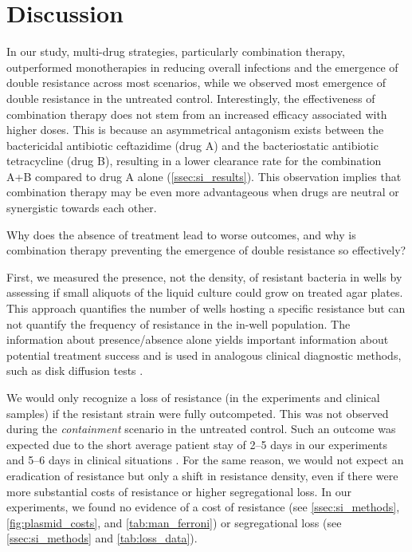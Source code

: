 \section{Discussion}
In our study, multi-drug strategies, particularly combination therapy, outperformed monotherapies in reducing overall infections and the emergence of double resistance across most scenarios, while we observed most emergence of double resistance in the untreated control.
Interestingly, the effectiveness of combination therapy does not stem from an increased efficacy associated with higher doses.
This is because an asymmetrical antagonism exists between the bactericidal antibiotic ceftazidime (drug A) and the bacteriostatic antibiotic tetracycline (drug B), resulting in a lower clearance rate for the combination A+B compared to drug A alone (\autoref{ssec:si_results}).
This observation implies that combination therapy may be even more advantageous when drugs are neutral or synergistic towards each other.

Why does the absence of treatment lead to worse outcomes, and why is combination therapy preventing the emergence of double resistance so effectively?

First, we measured the presence, not the density, of resistant bacteria in wells by assessing if small aliquots of the liquid culture could grow on treated agar plates.
This approach quantifies the number of wells hosting a specific resistance but can not quantify the frequency of resistance in the in-well population.
The information about presence/absence alone yields important information about potential treatment success and is used in analogous clinical diagnostic methods, such as disk diffusion tests \cite{eucast_disk2024}.

We would only recognize a loss of resistance (in the experiments and clinical samples) if the resistant strain were fully outcompeted.
This was not observed during the \textit{containment} scenario in the untreated control.
Such an outcome was expected due to the short average patient stay of 2--5 days in our experiments and 5--6 days in clinical situations \cite{BAG2015}.
For the same reason, we would not expect an eradication of resistance but only a shift in resistance density, even if there were more substantial costs of resistance or higher segregational loss.
In our experiments, we found no evidence of a cost of resistance (see \autoref{ssec:si_methods}, \autoref{fig:plasmid_costs}, and \autoref{tab:man_ferroni}) or segregational loss (see \autoref{ssec:si_methods} and \autoref{tab:loss_data}).

